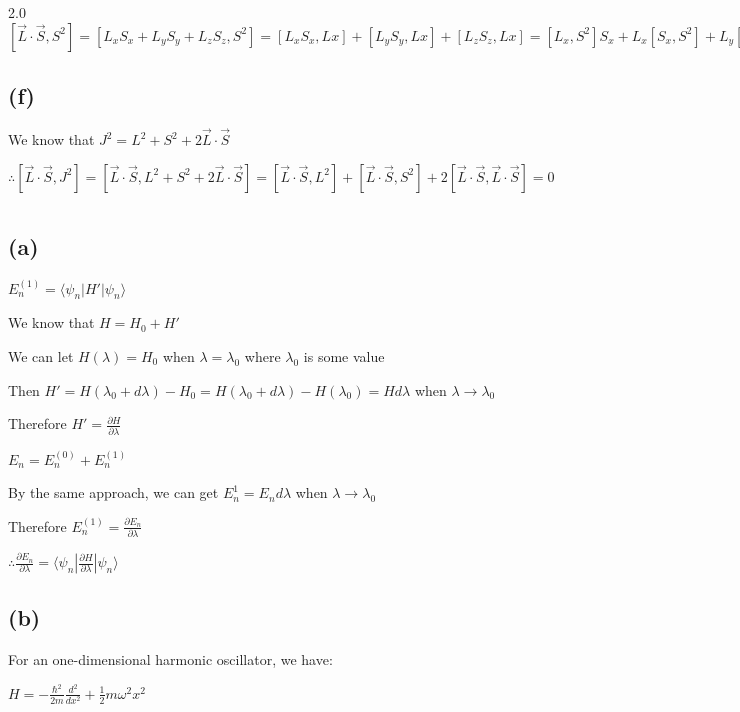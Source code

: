 \documentclass[12pt]{article}
\begin{document}
\begin{spacing}{2.0}
$[\vec{L}\cdot \vec{S},S^2]= [L_xS_x+ L_yS_y+ L_zS_z, S^2]= [L_xS_x,Lx]+ [L_yS_y,Lx] + [L_zS_z,Lx] = [L_x,S^2]S_x+ L_x[S_x,S^2]+ L_y[S_y,S^2] +S_y[L_y,S^2] +[L_z,S^2]S_z +L_z[S_z,S^2]= 0$

\subsection*{(f)}

We know that $J^2=L^2+S^2+2\vec{L}\cdot\vec{S}$

$\therefore [\vec{L}\cdot \vec{S},J^2]= [\vec{L}\cdot \vec{S},L^2+S^2+2\vec{L}\cdot\vec{S}]= [\vec{L}\cdot \vec{S},L^2] + [\vec{L}\cdot \vec{S},S^2] +2[\vec{L}\cdot \vec{S},\vec{L}\cdot \vec{S}] = 0$

\section{} %

\subsection*{(a)}

$E_n^{(1)}= \langle \psi_n|H'|\psi_n \rangle $

We know that $H=H_0+H'$

We can let $H(\lambda)=H_0$ when $\lambda=\lambda_0$ where $\lambda_0$ is some value

Then $H'=H(\lambda_0+d\lambda)-H_0= H(\lambda_0+d\lambda)- H(\lambda_0)= H d\lambda$ when $\lambda \rightarrow \lambda_0$

Therefore $H'=\frac{\partial H}{\partial \lambda}$

$E_n=E_n^{(0)}+E_n^{(1)}$

By the same approach, we can get $E_n^{1}= E_n d\lambda$ when $\lambda \rightarrow \lambda_0$

Therefore $E_n^{(1)}=\frac{\partial E_n}{\partial \lambda}$

$\therefore \frac{\partial E_n}{\partial \lambda}= \langle \psi_n|\frac{\partial H}{\partial \lambda}|\psi_n \rangle$

\subsection*{(b)}

For an one-dimensional harmonic oscillator, we have:

$H=-\frac{\hbar^2}{2m}\frac{d^2}{dx^2} + \frac{1}{2}m\omega^2x^2$


\end{spacing}
\end{document}
